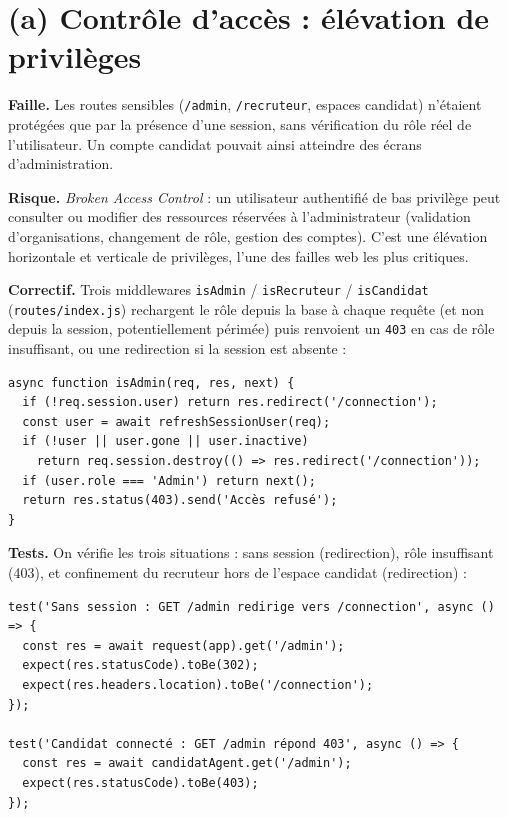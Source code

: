 \documentclass[12pt,a4paper]{article}
\begin{document}
\section{(a) Contrôle d'accès : élévation de privilèges}

\textbf{Faille.} Les routes sensibles (\texttt{/admin}, \texttt{/recruteur}, espaces candidat) n'étaient protégées que par la présence d'une session, sans vérification du rôle réel de l'utilisateur. Un compte candidat pouvait ainsi atteindre des écrans d'administration.

\textbf{Risque.} \textit{Broken Access Control} : un utilisateur authentifié de bas privilège peut consulter ou modifier des ressources réservées à l'administrateur (validation d'organisations, changement de rôle, gestion des comptes). C'est une élévation horizontale et verticale de privilèges, l'une des failles web les plus critiques.

\textbf{Correctif.} Trois middlewares \texttt{isAdmin} / \texttt{isRecruteur} / \texttt{isCandidat} (\texttt{routes/index.js}) rechargent le rôle depuis la base à chaque requête (et non depuis la session, potentiellement périmée) puis renvoient un \texttt{403} en cas de rôle insuffisant, ou une redirection si la session est absente :

\begin{lstlisting}
async function isAdmin(req, res, next) {
  if (!req.session.user) return res.redirect('/connection');
  const user = await refreshSessionUser(req);
  if (!user || user.gone || user.inactive)
    return req.session.destroy(() => res.redirect('/connection'));
  if (user.role === 'Admin') return next();
  return res.status(403).send('Accès refusé');
}
\end{lstlisting}

\textbf{Tests.} On vérifie les trois situations : sans session (redirection), rôle insuffisant (403), et confinement du recruteur hors de l'espace candidat (redirection) :

\begin{lstlisting}
test('Sans session : GET /admin redirige vers /connection', async () => {
  const res = await request(app).get('/admin');
  expect(res.statusCode).toBe(302);
  expect(res.headers.location).toBe('/connection');
});

test('Candidat connecté : GET /admin répond 403', async () => {
  const res = await candidatAgent.get('/admin');
  expect(res.statusCode).toBe(403);
});
\end{lstlisting}
\end{document}
